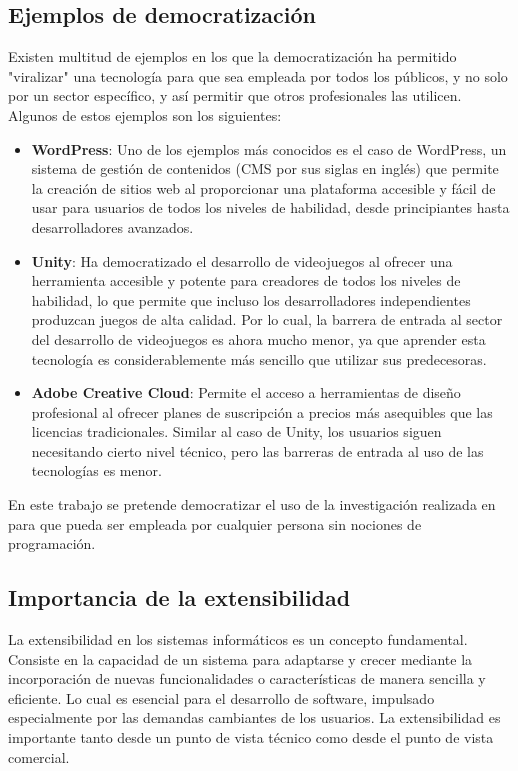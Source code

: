 \subsection{Ejemplos de democratización}

Existen multitud de ejemplos en los que la democratización ha permitido "viralizar" una tecnología para que sea empleada por todos los públicos, y no solo por un sector específico, y así permitir que otros profesionales las utilicen. Algunos de estos ejemplos son los siguientes: 

\begin{itemize}
	
	\item \textbf{WordPress}: Uno de los ejemplos más conocidos es el caso de WordPress, un sistema de gestión de contenidos (CMS por sus siglas en inglés) que permite la creación de sitios web al proporcionar una plataforma accesible y fácil de usar para usuarios de todos los niveles de habilidad, desde principiantes hasta desarrolladores avanzados.
	
	\item \textbf{Unity}: Ha democratizado el desarrollo de videojuegos al ofrecer una herramienta accesible y potente para creadores de todos los niveles de habilidad, lo que permite que incluso los desarrolladores independientes produzcan juegos de alta calidad. Por lo cual, la barrera de entrada al sector del desarrollo de videojuegos es ahora mucho menor, ya que aprender esta tecnología es considerablemente más sencillo que utilizar sus predecesoras.
	
	\item \textbf{Adobe Creative Cloud}: Permite el acceso a herramientas de diseño profesional al ofrecer planes de suscripción a precios más asequibles que las licencias tradicionales. Similar al caso de Unity, los usuarios siguen necesitando cierto nivel técnico, pero las barreras de entrada al uso de las tecnologías es menor.

	
\end{itemize}

En este trabajo se pretende democratizar el uso de la investigación realizada en \ga para que pueda ser empleada por cualquier persona sin nociones de programación.

\subsection{Importancia de la extensibilidad}

La extensibilidad en los sistemas informáticos es un concepto fundamental. Consiste en la capacidad de un sistema para adaptarse y crecer mediante la incorporación de nuevas funcionalidades o características de manera sencilla y eficiente. Lo cual es esencial para el desarrollo de software, impulsado especialmente por las demandas cambiantes de los usuarios. La extensibilidad es importante tanto desde un punto de vista técnico como desde el punto de vista comercial.

